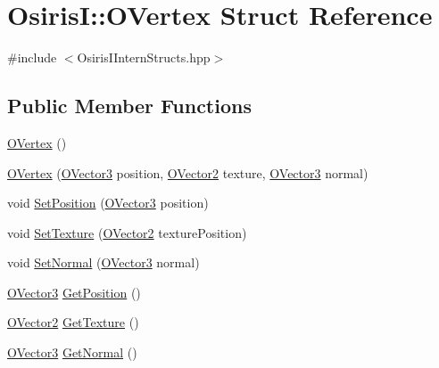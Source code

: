 \hypertarget{struct_osiris_i_1_1_o_vertex}{\section{Osiris\-I\-:\-:O\-Vertex Struct Reference}
\label{struct_osiris_i_1_1_o_vertex}
}


{\ttfamily \#include $<$Osiris\-I\-Intern\-Structs.\-hpp$>$}

\subsection*{Public Member Functions}
\begin{DoxyCompactItemize}
\item 
\hyperlink{struct_osiris_i_1_1_o_vertex_a68f717ed0fdd57e3764308fbb18693a1}{O\-Vertex} ()
\item 
\hyperlink{struct_osiris_i_1_1_o_vertex_a9cf373235ca71936ee0a89c12ae1f32f}{O\-Vertex} (\hyperlink{struct_osiris_i_1_1_o_vector3}{O\-Vector3} position, \hyperlink{struct_osiris_i_1_1_o_vector2}{O\-Vector2} texture, \hyperlink{struct_osiris_i_1_1_o_vector3}{O\-Vector3} normal)
\item 
void \hyperlink{struct_osiris_i_1_1_o_vertex_afdf06af084307e9daa152b17d73ae993}{Set\-Position} (\hyperlink{struct_osiris_i_1_1_o_vector3}{O\-Vector3} position)
\item 
void \hyperlink{struct_osiris_i_1_1_o_vertex_a94cf08ca875f3efa3f3564fa67dcb954}{Set\-Texture} (\hyperlink{struct_osiris_i_1_1_o_vector2}{O\-Vector2} texture\-Position)
\item 
void \hyperlink{struct_osiris_i_1_1_o_vertex_a4ea34b1619f9be6d2246b66a6c464443}{Set\-Normal} (\hyperlink{struct_osiris_i_1_1_o_vector3}{O\-Vector3} normal)
\item 
\hyperlink{struct_osiris_i_1_1_o_vector3}{O\-Vector3} \hyperlink{struct_osiris_i_1_1_o_vertex_aed4ccb379292416cca948b702ff12e97}{Get\-Position} ()
\item 
\hyperlink{struct_osiris_i_1_1_o_vector2}{O\-Vector2} \hyperlink{struct_osiris_i_1_1_o_vertex_a90792e34eac6ad243822cc5b84878d5f}{Get\-Texture} ()
\item 
\hyperlink{struct_osiris_i_1_1_o_vector3}{O\-Vector3} \hyperlink{struct_osiris_i_1_1_o_vertex_aec0ae30697a8265d34d27770ac4a77b4}{Get\-Normal} ()
\end{DoxyCompactItemize}


